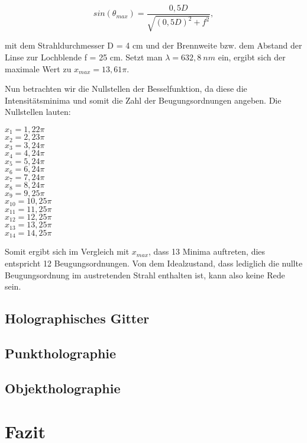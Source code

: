 \documentclass[bigchapter,colorback,accentcolor=tud4b,linedtoc,11pt]{tudreport}
\begin{document}
$$sin(\theta_{max}) = \frac{0,5 D}{\sqrt{(0,5 D)^2 + f^2}},$$

mit dem Strahldurchmesser D = 4 cm und der Brennweite bzw. dem Abstand der Linse zur Lochblende f = 25 cm. Setzt man $\lambda = 632,8~nm$ ein, ergibt sich der maximale Wert zu $x_{max} = 13,61 \pi$.

Nun betrachten wir die Nullstellen der Besselfunktion, da diese die Intensitätsminima und somit die Zahl der Beugungsordnungen angeben. Die Nullstellen lauten: 

\begin{center}
$x_1 = 1,22 \pi$ \\
$x_2 = 2,23 \pi$ \\
$x_3 = 3,24 \pi$ \\
$x_4 = 4,24 \pi$ \\
$x_5 = 5,24 \pi$ \\
$x_6 = 6,24 \pi$ \\
$x_7 = 7,24 \pi$ \\
$x_8 = 8,24 \pi$ \\
$x_9 = 9,25 \pi$ \\
$x_{10} = 10,25 \pi$ \\
$x_{11} = 11,25 \pi$ \\
$x_{12} = 12,25 \pi$ \\
$x_{13} = 13,25 \pi$ \\
$x_{14} = 14,25 \pi$
\end{center}

Somit ergibt sich im Vergleich mit $x_{max}$, dass 13 Minima auftreten, dies entspricht 12 Beugungsordnungen. Von dem Idealzustand, dass lediglich die nullte Beugungsordnung im austretenden Strahl enthalten ist, kann also keine Rede sein.

\section{Holographisches Gitter}

\section{Punktholographie}

\section{Objektholographie}

\chapter{Fazit}

\cleardoublepage{}
\newpage
\begin{thebibliography}{100}
\end{thebibliography}
\end{document}
